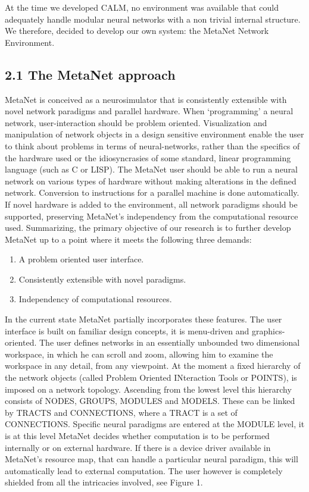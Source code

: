 \documentclass[11pt, a4paper]{article}
\begin{document}
At the time we developed CALM, no environment was available that could adequately handle modular neural networks with a non trivial internal structure. We therefore, decided to develop our own system: the MetaNet Network Environment.

\subsection*{\color{navyaccent} 2.1 The MetaNet approach}

MetaNet is conceived as a neurosimulator that is consistently extensible with novel network paradigms and parallel hardware. When `programming' a neural network, user-interaction should be problem oriented. Visualization and manipulation of network objects in a design sensitive environment enable the user to think about problems in terms of neural-networks, rather than the specifics of the hardware used or the idiosyncrasies of some standard, linear programming language (such as C or LISP). The MetaNet user should be able to run a neural network on various types of hardware without making alterations in the defined network. Conversion to instructions for a parallel machine is done automatically. If novel hardware is added to the environment, all network paradigms should be supported, preserving MetaNet's independency from the computational resource used. Summarizing, the primary objective of our research is to further develop MetaNet up to a point where it meets the following three demands:

\begin{enumerate}
  \item A problem oriented user interface.
  \item Consistently extensible with novel paradigms.
  \item Independency of computational resources.
\end{enumerate}

In the current state MetaNet partially incorporates these features. The user interface is built on familiar design concepts, it is menu-driven and graphics-oriented. The user defines networks in an essentially unbounded two dimensional workspace, in which he can scroll and zoom, allowing him to examine the workspace in any detail, from any viewpoint. At the moment a fixed hierarchy of the network objects (called Problem Oriented INteraction Tools or POINTS), is imposed on a network topology. Ascending from the lowest level this hierarchy consists of NODES, GROUPS, MODULES and MODELS. These can be linked by TRACTS and CONNECTIONS, where a TRACT is a set of CONNECTIONS. Specific neural paradigms are entered at the MODULE level, it is at this level MetaNet decides whether computation is to be performed internally or on external hardware. If there is a device driver available in MetaNet's resource map, that can handle a particular neural paradigm, this will automatically lead to external computation. The user however is completely shielded from all the intricacies involved, see Figure 1.
\end{document}
